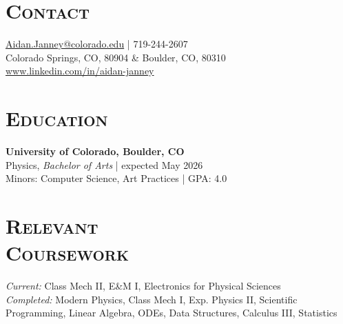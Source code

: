 \documentclass[11pt,line,letterpaper,margin]{res}
\begin{document}


 
\begin{resume}

\section{\scshape Contact} \href{mailto:aidan.janney@colorado.edu}{Aidan.Janney@colorado.edu} | 719-244-2607 \\ Colorado Springs, CO, 80904 \& Boulder, CO, 80310 \\ \href{https://www.linkedin.com/in/aidan-janney}{www.linkedin.com/in/aidan-janney}
 
 
 
\section{\scshape Education} {\bf University of Colorado, Boulder, CO} \\
                        Physics, {\sl Bachelor of Arts} | expected May 2026 \\
                        Minors: Computer Science, Art Practices | GPA: 4.0

\section{\scshape Relevant \\ Coursework} {\sl Current:} Class Mech II, E\&M I, Electronics for Physical Sciences  \\ {\sl Completed:} Modern Physics, Class Mech I, Exp. Physics II, Scientific Programming, Linear Algebra, ODEs, Data Structures, Calculus III, Statistics
 

\end{resume}
\end{document}
